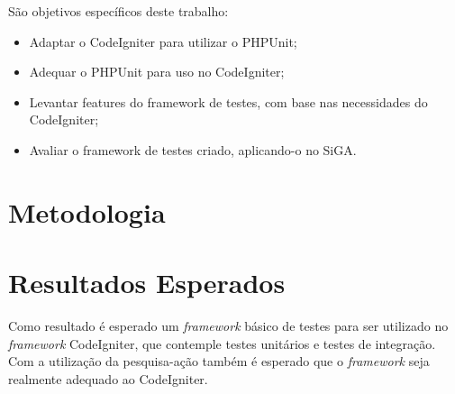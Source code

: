 São objetivos específicos deste trabalho:

\begin{itemize}
 \item Adaptar o CodeIgniter para utilizar o PHPUnit;
 \item Adequar o PHPUnit para uso no CodeIgniter;
 \item Levantar features do framework de testes, com base nas necessidades do CodeIgniter;
 \item Avaliar o framework de testes criado, aplicando-o no SiGA.
\end{itemize}


\section{Metodologia}

	

\section{Resultados Esperados}

Como resultado é esperado um \textit{framework} básico de testes para ser utilizado no \textit{framework} CodeIgniter, que contemple
testes unitários e testes de integração. Com a utilização da pesquisa-ação também é esperado que o \textit{framework} seja realmente adequado
ao CodeIgniter. 

